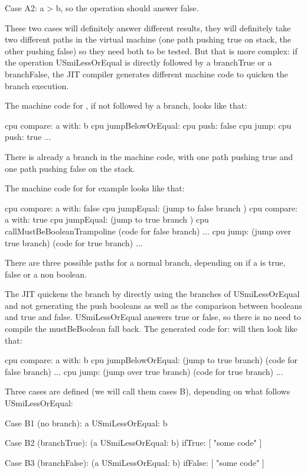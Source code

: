 \documentclass[a4paper,12pt,twoside]{../includes/ThesisStyle}
\begin{document}
Case A2: a > b, so the operation should answer false.

These two cases will definitely answer different results, they will definitely take two different paths in the virtual machine (one path pushing true on stack, the other pushing false) so they need both to be tested. But that is more complex: if the operation USmiLessOrEqual is directly followed by a branchTrue or a branchFalse, the JIT compiler generates different machine code to quicken the branch execution.

The machine code for , if not followed by a branch, looks like that:

\begin{code}
cpu compare: a with: b
cpu jumpBelowOrEqual:
cpu push: false
cpu jump:
cpu push: true
...
\end{code}

There is already a branch in the machine code, with one path pushing true and one path pushing false on the stack.

The machine code for  for example looks like that:

cpu compare: a with: false
cpu jumpEqual: (jump to false branch )
cpu compare: a with: true
cpu jumpEqual: (jump to true branch )
cpu callMustBeBooleanTrampoline
(code for false branch)
...
cpu jump: (jump over true branch)
(code for true branch)
...

There are three possible paths for a normal branch, depending on if a is true, false or a non boolean.

The JIT quickens the branch by directly using the branches of USmiLessOrEqual and not generating the push booleans as well as the comparison between booleans and true and false. USmiLessOrEqual answers true or false, so there is no need to compile the mustBeBoolean fall back. The generated code for:  will then look like that:

cpu compare: a with: b
cpu jumpBelowOrEqual: (jump to true branch)
(code for false branch)
...
cpu jump: (jump over true branch)
(code for true branch)
...

Three cases are defined (we will call them cases B), depending on what follows USmiLessOrEqual:

Case B1 (no branch):
a USmiLessOrEqual: b

Case B2 (branchTrue):
(a USmiLessOrEqual: b) ifTrue: [ "some code" ]

Case B3 (branchFalse):
(a USmiLessOrEqual: b) ifFalse: [ "some code" ]
\end{document}
